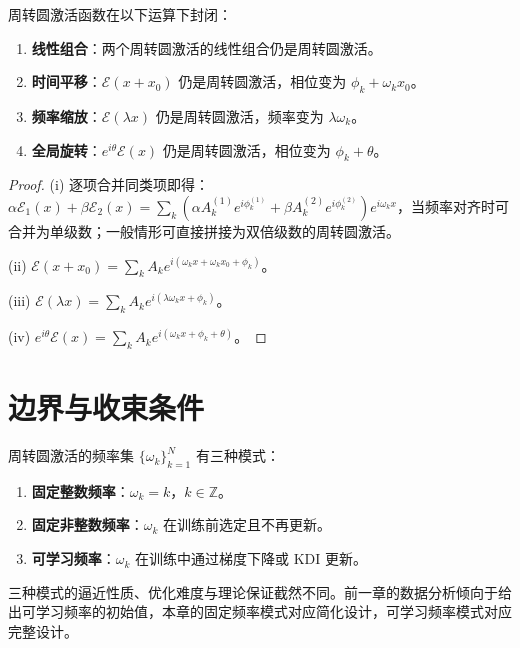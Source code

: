 \begin{property}[线性叠加与闭包]\label{prop:epicycle-closure}
周转圆激活函数在以下运算下封闭：
\begin{enumerate}[label=(\roman*)]
    \item \textbf{线性组合}：两个周转圆激活的线性组合仍是周转圆激活。
    \item \textbf{时间平移}：$\mathcal E(x+x_0)$ 仍是周转圆激活，相位变为 $\phi_k+\omega_k x_0$。
    \item \textbf{频率缩放}：$\mathcal E(\lambda x)$ 仍是周转圆激活，频率变为 $\lambda\omega_k$。
    \item \textbf{全局旋转}：$e^{i\theta}\mathcal E(x)$ 仍是周转圆激活，相位变为 $\phi_k+\theta$。
\end{enumerate}
\end{property}

\begin{proof}
(i) 逐项合并同类项即得：$\alpha\mathcal E_1(x)+\beta\mathcal E_2(x)=\sum_k(\alpha A_k^{(1)}e^{i\phi_k^{(1)}}+\beta A_k^{(2)}e^{i\phi_k^{(2)}})e^{i\omega_k x}$，当频率对齐时可合并为单级数；一般情形可直接拼接为双倍级数的周转圆激活。

(ii) $\mathcal E(x+x_0)=\sum_k A_k e^{i(\omega_k x+\omega_k x_0+\phi_k)}$。

(iii) $\mathcal E(\lambda x)=\sum_k A_k e^{i(\lambda\omega_k x+\phi_k)}$。

(iv) $e^{i\theta}\mathcal E(x)=\sum_k A_k e^{i(\omega_k x+\phi_k+\theta)}$。
\end{proof}

\section{边界与收束条件}

\begin{definition}[三种频率模式]\label{def:frequency-modes}
周转圆激活的频率集 $\{\omega_k\}_{k=1}^{N}$ 有三种模式：
\begin{enumerate}[label=(\roman*)]
    \item \textbf{固定整数频率}：$\omega_k=k$，$k\in\mathbb Z$。
    \item \textbf{固定非整数频率}：$\omega_k$ 在训练前选定且不再更新。
    \item \textbf{可学习频率}：$\omega_k$ 在训练中通过梯度下降或 KDI 更新。
\end{enumerate}
三种模式的逼近性质、优化难度与理论保证截然不同。前一章的数据分析倾向于给出可学习频率的初始值，本章的固定频率模式对应简化设计，可学习频率模式对应完整设计。
\end{definition}

